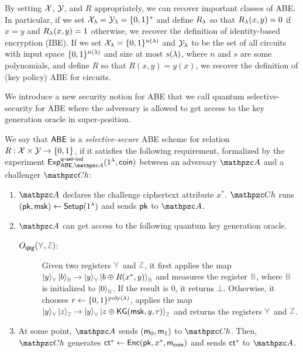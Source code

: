 By setting $\mathcal{X}$, $\mathcal{Y}$, and $R$ appropriately, we can recover
important classes of ABE. In particular, if we set
$\mathcal{X}_\lambda=\mathcal{Y}_\lambda=\{0,1\}^*$ and define $R_\lambda$ so that
$R_\lambda(x,y)=0$ if $x=y$ and $R_\lambda(x,y)=1$ otherwise, we recover
the definition of identity-based encryption (IBE). 
If we set $\mathcal{X}_\lambda=\{0,1\}^{n(\lambda)}$ and $\mathcal{Y}_\lambda$ to be the set of all circuits with input space $\{0,1\}^{n(\lambda)}$ and size at most $s(\lambda)$, where $n$ and $s$ are some polynomials, and define $R$ so that $R(x,y)=y(x)$, we recover the definition of (key policy) ABE for circuits. 

We introduce a new security notion for ABE that we call quantum selective-security for ABE where the adversary is allowed to get access to the key generation oracle in super-position.


\begin{definition}\label{def:qsel_ind_ABE}
We say that $\mathsf{ABE}$ is a \emph{selective-secure} ABE scheme for
relation $R:\mathcal{X}\times \mathcal{Y} \to \{0,1\}$, if it satisfies the following
requirement, formalized by the experiment
$\expc{\ABE, \qA}{q}{sel}{ind}(1^\secp,\coin)$ between an adversary
$\qA$ and a challenger $\qCh$:
        \begin{enumerate}
            \item $\qA$ declares the challenge ciphertext attribute
                $x^*$. $\qCh$ runs $(\mathsf{pk},\mathsf{msk})\leftarrow\mathsf{Setup}(1^\lambda)$ and sends $\mathsf{pk}$ to $\qA$.
            \item $\qA$ can get access to the following quantum key generation oracle.
            \begin{description}

    \item[$\Oracle{qkg}(\qreg{Y},\qreg{Z})$:] Given two registers
        $\qreg{Y}$ and $\qreg{Z}$, it first applies the map
        $\ket{y}_{\qreg{Y}}\ket{b}_{\qreg{B}}\ra\ket{y}_{\qreg{Y}}\ket{b\oplus
        R(x^*,y)}_{\qreg{B}}$ and measures the register $\qreg{B}$, where $\qreg{B}$ is initialized to $\ket{0}_\qreg{B}$.
    If the result is $0$, it returns $\bot$. Otherwise, it
    chooses $r \leftarrow \{0,1\}^{{\mathrm{poly}}(\lambda)}$, applies
    the map
    $\ket{y}_{\qreg{Y}}\ket{z}_{\qreg{Z}}\ra\ket{y}_{\qreg{Y}}\ket{z\oplus
    \KG(\msk,y,r)}_{\qreg{Z}}$ and returns the registers $\qreg{Y}$
    and $\qreg{Z}$.
    \end{description}

\item At some point, $\qA$ sends $(\mathsf{m}_0,\mathsf{m}_1)$ to $\qCh$. Then, $\qCh$
generates $\mathsf{ct}^*\leftarrow\mathsf{Enc}(\mathsf{pk},x^*,\allowbreak\mathsf{m}_{\mathsf{coin}})$ and sends $\mathsf{ct}^*$ to
$\qA$.


\end{enumerate}
\end{definition}
